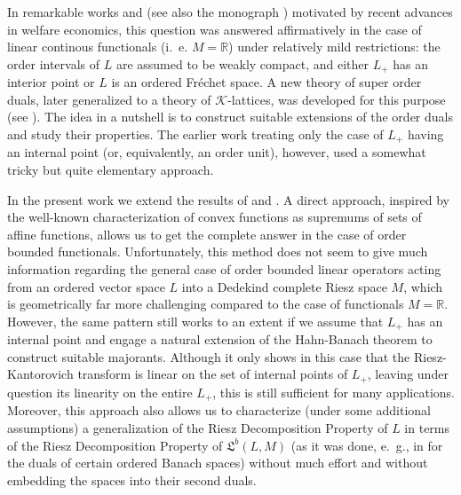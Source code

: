 \documentclass [a4paper, 12pt] {amsart}
\newcommand {\blinop} [2] {\ensuremath{\mathfrak L^b (#1, #2)}}
\begin{document}
In remarkable works \cite {aliprantisetal2000} and \cite {aliprantistourky2002} (see also the monograph \cite {conesandduality})
motivated by recent advances in
welfare economics,
this question was answered affirmatively in the case of linear continous functionals (i.~e. $M = \mathbb R$) under relatively mild restrictions:
the order intervals of $L$ are assumed to be weakly compact, and either $L_+$ has an interior point or $L$ is an ordered
Fréchet space.  A new theory of super order duals, later generalized to a theory of
$\mathcal K$-lattices, was developed for this purpose (see \cite [\S 5.1] {conesandduality}).
The idea in a nutshell is to construct suitable extensions of the order duals and study their properties.
The earlier work \cite {aliprantisetal2000}
treating only the case of $L_+$ having an internal point (or, equivalently, an order unit), however,
used a somewhat tricky but quite elementary approach.

In the present work we extend the results of \cite {aliprantisetal2000} and \cite {aliprantistourky2002}.
A direct approach, inspired by the well-known characterization of convex functions as supremums of sets of affine functions,
allows us to get the complete answer in the case of order bounded functionals.
Unfortunately, this method does not seem to give much information regarding
the general case of order bounded linear operators acting from an ordered vector space $L$ into a Dedekind complete Riesz space $M$,
which is geometrically far more challenging compared to the case of functionals $M = \mathbb R$.
However, the same pattern still works to an extent if we assume that $L_+$ has an internal point and engage a natural extension of the Hahn-Banach theorem
to construct suitable majorants.
Although it only shows in this case that the Riesz-Kantorovich transform is linear on the set of internal points of $L_+$,
leaving under question its linearity on the entire $L_+$, this is still sufficient for many applications.
Moreover, this approach also allows us to characterize (under some additional assumptions)
a generalization of the Riesz Decomposition Property of $L$ in terms of the Riesz Decomposition Property
of $\blinop {L} {M}$ (as it was done, e.~g., in \cite {ando1962} for the duals of certain ordered Banach spaces)
without much effort and without embedding the spaces into their second duals.
\end{document}
